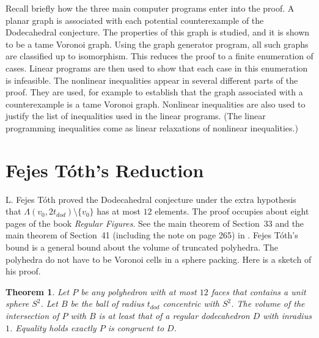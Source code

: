 \documentclass{article} %
\newtheorem{theorem}{Theorem}[section]
\begin{document}
Recall briefly how the three main computer programs
enter into the proof.  A planar graph is associated with
each potential counterexample of the Dodecahedral conjecture.
The properties of this graph is studied, and it is shown to
be a tame Voronoi graph.  Using the graph generator program,
all such graphs are classified up to isomorphism.  This
reduces the proof to a finite enumeration of cases. Linear programs
are then used to show that each case in this enumeration is 
infeasible.  The nonlinear inequalities appear in several different
parts of the proof.
They are used, for example to establish that the graph associated
with a counterexample is a tame Voronoi graph.  Nonlinear
inequalities are also used to justify the list of inequalities
used in the linear programs. (The linear programming inequalities
come as linear relaxations of nonlinear inequalities.)



\section{Fejes T\'oth's Reduction}\label{sec:12sphere}

L. Fejes T\'oth proved  the Dodecahedral conjecture 
under the extra hypothesis that $\Lambda(v_0,2t_{dod})\setminus\{v_0\}$
has at most $12$  elements.  The proof occupies about
eight pages of the book {\it Regular Figures}.  See the main
theorem of
Section~33 and the main theorem of Section~41 (including
the note on page 265) in \cite{Toth:1964:Regular}.  Fejes T\'oth's
bound is a general bound about the volume of truncated polyhedra.
The polyhedra do not have to be Voronoi cells in a sphere packing.
Here is a sketch of his proof.

\begin{theorem}  Let $P$ be any polyhedron with at most $12$ faces
that contains a unit sphere $S^2$.  Let $B$ be the ball of
radius $t_{dod}$ concentric with $S^2$.  The volume of the intersection
of $P$ with $B$ is
at least that of a regular
dodecahedron $D$ with inradius $1$.
Equality holds exactly $P$ is congruent to $D$.
\end{theorem}
\end{document}
